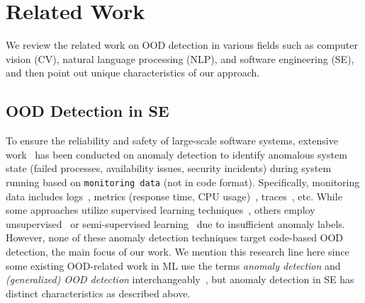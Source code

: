\section{Related Work}\label{sec:related}
We review the related work on OOD detection in various fields such as computer vision (CV), natural language processing (NLP), and software engineering (SE), and then point out unique characteristics of our approach. 

\subsection{OOD Detection in SE}

To ensure the reliability and safety of large-scale software systems, extensive work~\cite{ le2022log, yu2024deep, zhang2024metalog} has been conducted on anomaly detection to identify anomalous system state (\eg failed processes, availability issues, security incidents) during system running based on \texttt{\small monitoring data} (not in code format). Specifically, monitoring data includes logs~\cite{le2022log, wang2023logonline}, metrics (\eg response time, CPU usage)~\cite{metrics2021zervas}, traces~\cite{traces2020guo, traces2021liu}, etc. While some approaches utilize supervised learning techniques~\cite{zhang2019robust, lu2018detecting}, others employ unsupervised~\cite{farzad2020unsupervised} or semi-supervised learning~\cite{yang2021semi, Heter2023lee} due to insufficient anomaly labels. However, none of these anomaly detection techniques target code-based OOD detection, the main focus of our work. We mention this research line here since some existing OOD-related work in ML use the terms \textit{anomaly detection} and \textit{(generalized) OOD detection}  interchangeably~\cite{hendrycks2018deep}, but anomaly detection in SE has distinct characteristics as described above.



